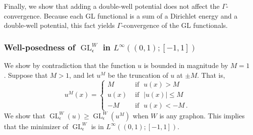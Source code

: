 \documentclass[11pt]{amsart}
\def\ep{\epsilon}
\def\GL{\operatorname{GL}}
\numberwithin{equation}{section}
\begin{document}
{{Finally, we show that adding a double-well potential does not affect the $\Gamma$-convergence. {Because each GL functional is a sum of a Dirichlet energy and a double-well potential, this fact} yields $\Gamma$-convergence of the GL functionals. 



\subsubsection{\texorpdfstring{Well-posedness {of $\GL^W_\ep$} in $L^\infty((0,1); [-1,1])$}{Well-posedness}}\label{sec: well-posedness} 

We show by contradiction that the function $u$ is bounded {in magnitude} by $M = 1$. Suppose that $M >1$, and let $u^M$ be the truncation of $u$ at $\pm M$. That is, 
\begin{equation} 
	u^M(x) = \begin{cases}
		M &\text{ if } \,\, u(x) > M \\
		u(x) &\text{ if } \,\, |u(x)| \leq M	\\
		-M &\text{ if } \,\, u(x) < -M \,.
\end{cases}
\end{equation}
We show that $\GL^W_\ep(u) \geq \GL^W_\ep(u^M)$ when $W$ is any graphon. This implies that the minimizer of $\GL^W_\ep$ is in $L^\infty((0,1); [-1,1])$.

}}
\end{document}
